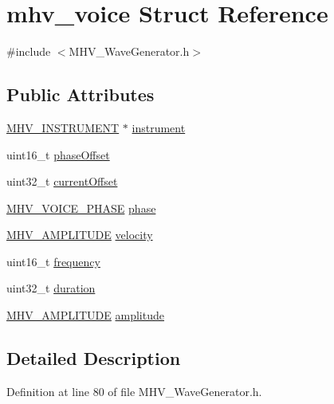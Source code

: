\hypertarget{structmhv__voice}{
\section{mhv\-\_\-voice \-Struct \-Reference}
\label{structmhv__voice}
}


{\ttfamily \#include $<$\-M\-H\-V\-\_\-\-Wave\-Generator.\-h$>$}

\subsection*{\-Public \-Attributes}
\begin{DoxyCompactItemize}
\item 
\hyperlink{_m_h_v___wave_generator_8h_ad8420c0a6c4bf917359c2c4f2e7720d3}{\-M\-H\-V\-\_\-\-I\-N\-S\-T\-R\-U\-M\-E\-N\-T} $\ast$ \hyperlink{structmhv__voice_ad13f45665cd3e683530f21ac2824aa5d}{instrument}
\item 
uint16\-\_\-t \hyperlink{structmhv__voice_a24e2f2d4a979d1f00b338b48f741c217}{phase\-Offset}
\item 
uint32\-\_\-t \hyperlink{structmhv__voice_a338eb6b52bea8bcedc46dab7e854d138}{current\-Offset}
\item 
\hyperlink{_m_h_v___wave_generator_8h_ac654c7265d33a8268f0fae7e46219fe2}{\-M\-H\-V\-\_\-\-V\-O\-I\-C\-E\-\_\-\-P\-H\-A\-S\-E} \hyperlink{structmhv__voice_acb00a6c0fe99ecfebb9f5b1ed66c51be}{phase}
\item 
\hyperlink{_m_h_v___wave_generator_8h_ae0ff00bbcfd596fc3d6afab09bb5e11c}{\-M\-H\-V\-\_\-\-A\-M\-P\-L\-I\-T\-U\-D\-E} \hyperlink{structmhv__voice_a8f99a4e928e8698be419b3863232bc62}{velocity}
\item 
uint16\-\_\-t \hyperlink{structmhv__voice_a4b98f1d1e32ae313d6f30b9f6a32d2fd}{frequency}
\item 
uint32\-\_\-t \hyperlink{structmhv__voice_a1e3b7b6c0a725010eb983f606e93079d}{duration}
\item 
\hyperlink{_m_h_v___wave_generator_8h_ae0ff00bbcfd596fc3d6afab09bb5e11c}{\-M\-H\-V\-\_\-\-A\-M\-P\-L\-I\-T\-U\-D\-E} \hyperlink{structmhv__voice_a23c0a77a91913bf94930bb9f0e9fc28b}{amplitude}
\end{DoxyCompactItemize}


\subsection{\-Detailed \-Description}


\-Definition at line 80 of file \-M\-H\-V\-\_\-\-Wave\-Generator.\-h.



